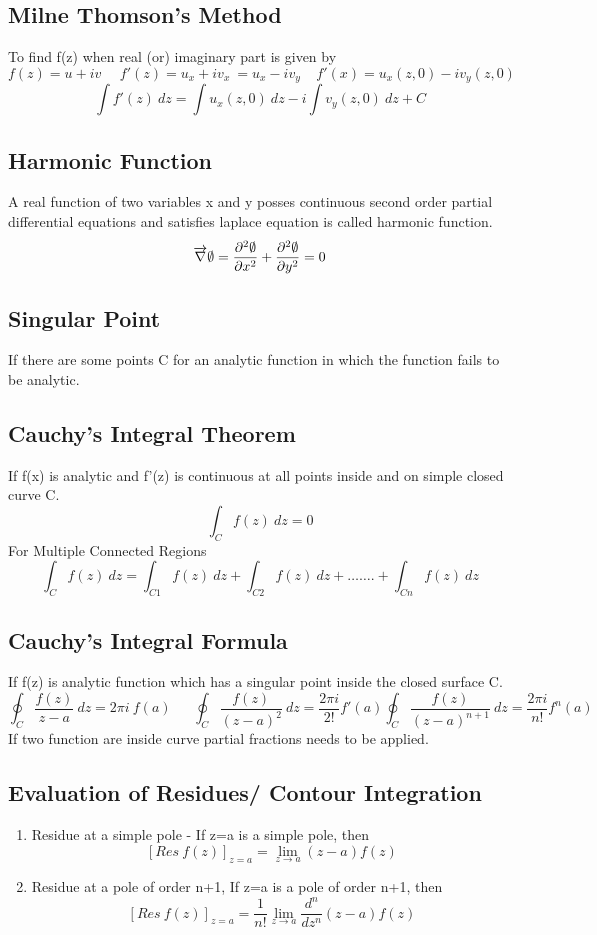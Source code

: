 \subsection*{Milne Thomson's Method}
To find f(z) when real (or) imaginary part is given by
\[f(z)=u+iv\ \ \ \ \ \ f'(z)=u_x+iv_x\ = u_x - iv_y\ \ \ \ \ f'(x) = u_x(z,0)-iv_y(z,0)\]
\[\int f'(z)\ dz=\int u_x(z,0)\ dz-i\int v_y(z,0)\ dz + C\]

\subsection*{Harmonic Function}
A real function of two variables x and y posses continuous second order partial differential equations and satisfies laplace equation is called harmonic function.
\[\overrightarrow{\rm \nabla}\emptyset=\frac{\partial^2\emptyset}{\partial x^2}+\frac{\partial^2\emptyset}{\partial y^2}=0\]

\subsection*{Singular Point}
If there are some points C for an analytic function in which the function fails to be analytic.

\subsection{Cauchy's Integral Theorem}
If f(x) is analytic and f'(z) is continuous at all points inside and on simple closed curve C.
\[\int_C f(z)\ dz=0\]
For Multiple Connected Regions
\[\int_C f(z)\ dz= \int_{C1}f(z)\ dz+\int_{C2}f(z)\ dz+\ldots\ldots.+\int_{Cn}f(z)\ dz\]

\subsection{Cauchy's Integral Formula}
If f(z) is analytic function which has a singular point inside the closed surface C.
\[\oint_C \frac{f(z)}{z-a}\ dz=2\pi i\ f(a)\ \ \ \ \ \ \ \oint_C\frac{f(z)}{(z-a)^2}\ dz= \frac{2 \pi i}{2!}f'(a) \oint_C\frac{f(z)}{(z-a)^{n+1}}\ dz= \frac{2 \pi i}{n!}f^n(a)\]
If two function are inside curve partial fractions needs to be applied.

\subsection{Evaluation of Residues/ Contour Integration}
\begin{enumerate}
    \item Residue at a simple pole - If z=a is a simple pole, then
    \[[Res\ f(z)]_{z=a}=\lim_{z \to a}(z-a)f(z)\]
    \item Residue at a pole of order n+1, If z=a is a pole of order n+1, then
    \[[Res\ f(z)]_{z=a}=\frac{1}{n!}\lim_{z \to a}\frac{d^n}{dz^n}(z-a)f(z)\]
\end{enumerate}


